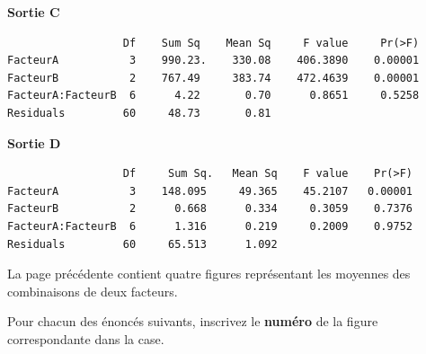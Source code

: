 \begin{questions}
{\bf Sortie C}
\begin{verbatim}
                  Df    Sum Sq    Mean Sq     F value     Pr(>F)    
FacteurA           3    990.23.    330.08    406.3890    0.00001
FacteurB           2    767.49     383.74    472.4639    0.00001
FacteurA:FacteurB  6      4.22       0.70      0.8651     0.5258    
Residuals         60     48.73       0.81               
\end{verbatim}

{\bf Sortie D}
\begin{verbatim}
                  Df     Sum Sq.   Mean Sq    F value    Pr(>F)    
FacteurA           3    148.095     49.365    45.2107   0.00001
FacteurB           2      0.668      0.334     0.3059    0.7376    
FacteurA:FacteurB  6      1.316      0.219     0.2009    0.9752    
Residuals         60     65.513      1.092                        
\end{verbatim}
La page précédente contient quatre figures représentant les moyennes des combinaisons de deux facteurs.


Pour chacun des énoncés suivants, inscrivez le \textbf{numéro} de la figure correspondante dans la case.
\begin{solution}
\begin{parts}

\end{parts}
\end{solution}
\end{questions}
